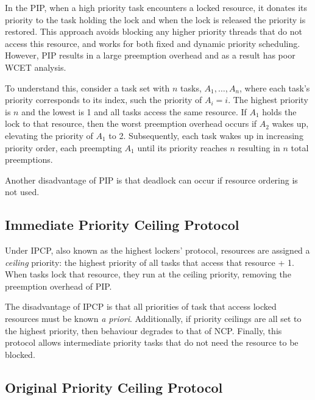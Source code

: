 In the \gls{PIP}, when a high priority task encounters a locked resource, it donates its priority 
to the task holding the lock and when the lock is released the priority is restored. 
This approach avoids blocking any higher priority threads that do not access this resource, and
works for both fixed and dynamic priority scheduling.
However, \gls{PIP} results in a large preemption overhead and as a result has poor WCET analysis.

To understand this, consider a task set with $n$ tasks, $A_{1}, \ldots, A_{n}$, where each task's priority
corresponds to its index, such the priority of $A_{i} = i$. The highest priority is $n$ and the
lowest is 1 and all tasks access the same resource. If $A_{1}$ holds the lock to that resource, then
the worst preemption overhead occurs if $A_{2}$ wakes up, elevating the priority of $A_{1}$ to 2. Subsequently,
each task wakes up in increasing priority order, each preempting $A_{1}$ until its priority reaches
$n$ resulting in $n$ total preemptions. 

Another disadvantage of \gls{PIP} is that deadlock can occur if resource ordering is not used.


\subsection{Immediate Priority Ceiling Protocol}
\label{sec:hlp}
\label{sec:ipcp}

Under \gls{IPCP}, also known as the highest lockers' protocol, resources are assigned a
\emph{ceiling} priority: the highest priority of all tasks that access that resource + 1.  When tasks
lock that resource, they run at the ceiling priority, removing the preemption overhead
of \gls{PIP}.

The disadvantage of \gls{IPCP} is that all priorities of task that access locked resources must be known \emph{a
priori}.  Additionally, if priority ceilings are all set to the highest priority, then behaviour
degrades to that of \gls{NCP}. Finally, this protocol allows intermediate priority tasks that do not need
the resource to be blocked. 

\subsection{Original Priority Ceiling Protocol}


